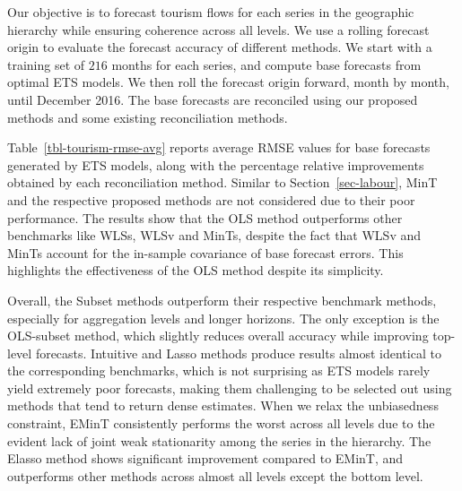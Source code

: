 \documentclass[
  11pt]{article}
\begin{document}
Our objective is to forecast tourism flows for each series in the
geographic hierarchy while ensuring coherence across all levels. We use
a rolling forecast origin to evaluate the forecast accuracy of different
methods. We start with a training set of \(216\) months for each series,
and compute base forecasts from optimal ETS models. We then roll the
forecast origin forward, month by month, until December 2016. The base
forecasts are reconciled using our proposed methods and some existing
reconciliation methods.

Table~\ref{tbl-tourism-rmse-avg} reports average RMSE values for base
forecasts generated by ETS models, along with the percentage relative
improvements obtained by each reconciliation method. Similar to
Section~\ref{sec-labour}, MinT and the respective proposed methods are
not considered due to their poor performance. The results show that the
OLS method outperforms other benchmarks like WLSs, WLSv and MinTs,
despite the fact that WLSv and MinTs account for the in-sample
covariance of base forecast errors. This highlights the effectiveness of
the OLS method despite its simplicity.

Overall, the Subset methods outperform their respective benchmark
methods, especially for aggregation levels and longer horizons. The only
exception is the OLS-subset method, which slightly reduces overall
accuracy while improving top-level forecasts. Intuitive and Lasso
methods produce results almost identical to the corresponding
benchmarks, which is not surprising as ETS models rarely yield extremely
poor forecasts, making them challenging to be selected out using methods
that tend to return dense estimates. When we relax the unbiasedness
constraint, EMinT consistently performs the worst across all levels due
to the evident lack of joint weak stationarity among the series in the
hierarchy. The Elasso method shows significant improvement compared to
EMinT, and outperforms other methods across almost all levels except the
bottom level.
\end{document}
